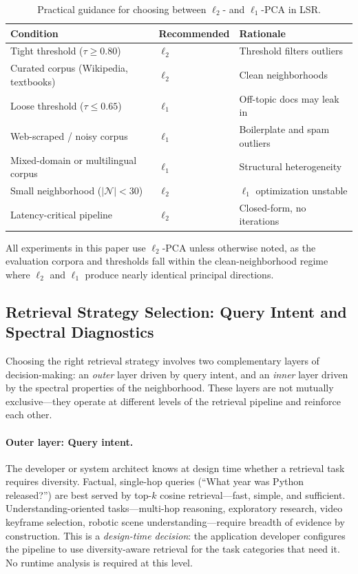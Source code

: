 \documentclass{article}
\begin{document}
\begin{table}[h]
\centering
\caption{Practical guidance for choosing between $\ell_2$- and $\ell_1$-PCA in LSR.}
\label{tab:l1-vs-l2}
\begin{tabular}{@{}lll@{}}
\toprule
\textbf{Condition} & \textbf{Recommended} & \textbf{Rationale} \\
\midrule
Tight threshold ($\tau \geq 0.80$) & $\ell_2$ & Threshold filters outliers \\
Curated corpus (Wikipedia, textbooks) & $\ell_2$ & Clean neighborhoods \\
Loose threshold ($\tau \leq 0.65$) & $\ell_1$ & Off-topic docs may leak in \\
Web-scraped / noisy corpus & $\ell_1$ & Boilerplate and spam outliers \\
Mixed-domain or multilingual corpus & $\ell_1$ & Structural heterogeneity \\
Small neighborhood ($|\mathcal{N}| < 30$) & $\ell_2$ & $\ell_1$ optimization unstable \\
Latency-critical pipeline & $\ell_2$ & Closed-form, no iterations \\
\bottomrule
\end{tabular}
\end{table}

All experiments in this paper use $\ell_2$-PCA unless otherwise noted, as the evaluation corpora and thresholds fall within the clean-neighborhood regime where $\ell_2$ and $\ell_1$ produce nearly identical principal directions.

\subsection{Retrieval Strategy Selection: Query Intent and Spectral Diagnostics}
\label{sec:adaptive}

Choosing the right retrieval strategy involves two complementary layers of decision-making: an \emph{outer} layer driven by query intent, and an \emph{inner} layer driven by the spectral properties of the neighborhood. These layers are not mutually exclusive---they operate at different levels of the retrieval pipeline and reinforce each other.

\paragraph{Outer layer: Query intent.}
The developer or system architect knows at design time whether a retrieval task requires diversity. Factual, single-hop queries (``What year was Python released?'') are best served by top-$k$ cosine retrieval---fast, simple, and sufficient. Understanding-oriented tasks---multi-hop reasoning, exploratory research, video keyframe selection, robotic scene understanding---require breadth of evidence by construction. This is a \emph{design-time decision}: the application developer configures the pipeline to use diversity-aware retrieval for the task categories that need it. No runtime analysis is required at this level.
\end{document}

